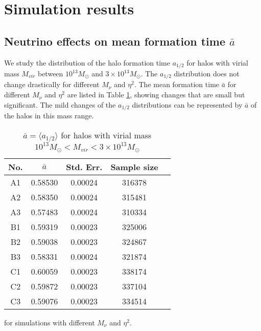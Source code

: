 \section{Simulation results}
\label{sec:result}
\subsection{Neutrino effects on mean formation time $\bar a$}
We study the distribution of the halo formation time $a_{1/2}$ for halos with virial mass $M_{vir}$ between $10^{13} M_\odot$ and $3\times 10^{13} M_\odot$. The $a_{1/2}$ distribution does not change drastically for different $M_\nu$ and $\eta^2$.
The mean formation time $\bar a$ for different $M_\nu$ and $\eta^2$ are listed in Table \ref{tab:formtime}, showing changes that are small but significant. The mild changes of the $a_{1/2}$ distributions can be represented by $\bar a$ of the halos in this mass range.

\begin{table}[!h]
		\begin{center}
		\begin{tabular}{|c|c|c|c|c|}
			\hline
			No. & $\bar a$ & Std. Err. & Sample size \\
			\hline \hline
			A1 & 0.58530 & 0.00024 & 316378  \\
			A2 & 0.58350 & 0.00024 & 315481  \\
			A3 & 0.57483 & 0.00024 & 310334  \\
			\hline
			B1 & 0.59319 & 0.00023 & 325006  \\
			B2 & 0.59038 & 0.00023 & 324867  \\
			B3 & 0.58331 & 0.00024  & 321874  \\
			\hline
			C1 & 0.60059 & 0.00023 & 338174  \\
			C2 & 0.59872 & 0.00023 & 337104  \\
			C3 & 0.59076 & 0.00023  & 334514  \\		
			\hline
		\end{tabular}
		\caption{\label{tab:formtime} $\bar a = \langle a_{1/2} \rangle$ for halos with virial mass $10^{13}M_\odot < M_{vir} <3\times10^{13} M_\odot$} for simulations with different $M_\nu$ and $\eta^2$.
		\end{center}
\end{table}


